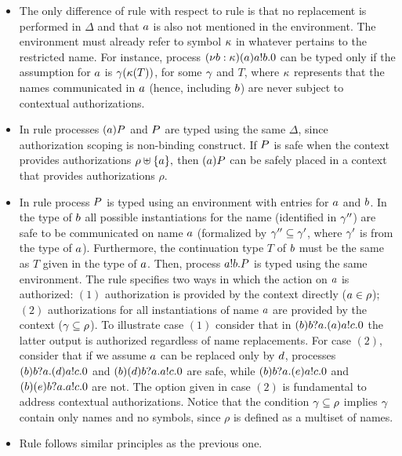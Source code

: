 \begin{itemize}
\item The only difference of rule  with respect to rule  is that no replacement is performed in $\Delta$ and that $a$ is also not mentioned in the environment. The environment must already refer to symbol ${\mathbf{\kappa}}$ in whatever pertains to the restricted name. For instance, process $(\nu b: {\mathbf{\kappa}})(a)a!b.0$ can be typed only if the assumption for $a$ is $\gamma({\mathbf{\kappa}}(T))$, for some $\gamma$ and $T$, where ${\mathbf{\kappa}}$ represents that the names communicated in $a$ (hence, including $b$) are never subject to contextual authorizations.
\item In rule  processes $(a)P$ and $P$ are typed using the same $\Delta$, since authorization scoping is non-binding construct.
If $P$ is safe when the context provides  authorizations $\rho\uplus \{a\},$ then 
$(a)P$ can be safely placed in a context that provides authorizations 
$\rho$.
\item In rule   process $P$ is typed using an environment 
with entries for $a$ and $b$. In the type of $b$ all possible instantiations for the name (identified in $\gamma''$) are safe to be communicated on name $a$ (formalized by $\gamma''\subseteq\gamma'$, where $\gamma'$ is from the type of $a$). Furthermore, the continuation type $T$ of $b$ must be the same as $T$ given in the type of $a$. Then, process $a!b.P$ is typed using the same environment.
The rule specifies two ways in which the action on $a$ is authorized: $(1)$ authorization is provided by the context directly ($a\in\rho$); 
$(2)$ authorizations for all instantiations of name $a$ are provided by the context ($\gamma \subseteq\rho$).
To illustrate case $(1)$ consider that in $(b)b?a.(a)a!c.0$ the latter output is authorized regardless of name replacements. For case $(2)$, consider that
if we  assume $a$ can be replaced only by $d$,
processes $(b)b?a.(d)a!c.0$ and $(b)(d)b?a.a!c.0$ are safe, while $(b)b?a.(e)a!c.0$ and $(b)(e)b?a.a!c.0$ are not.  
The option given in case $(2)$ is fundamental to address contextual authorizations. Notice that the condition  $\gamma \subseteq\rho$ implies $\gamma$ contain only names and no symbols, since $\rho$ is defined as a multiset of names. 
\item Rule
follows similar principles as the previous one.


\end{itemize}
